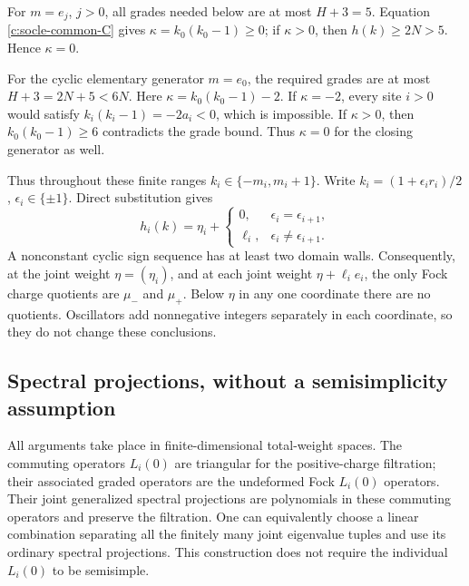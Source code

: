 \documentclass[11pt,a4paper]{article}
\numberwithin{equation}{section}
\theoremstyle{definition}\newtheorem{definition}[theorem]{Definition}
\theoremstyle{remark}\newtheorem{remark}[theorem]{Remark}
\begin{document}
For $m=e_j$, $j>0$, all grades needed below are at most $H+3=5$.
Equation \eqref{c:socle-common-C} gives $\kappa=k_0(k_0-1)\geq0$;
if $\kappa>0$, then $h(k)\geq2N>5$.  Hence $\kappa=0$.

For the cyclic elementary generator $m=e_0$, the required grades are
at most $H+3=2N+5<6N$.  Here $\kappa=k_0(k_0-1)-2$.
If $\kappa=-2$, every site $i>0$ would satisfy
$k_i(k_i-1)=-2a_i<0$, which is impossible.  If $\kappa>0$, then
$k_0(k_0-1)\geq6$ contradicts the grade bound.  Thus $\kappa=0$ for the closing generator as well.

Thus throughout these finite ranges $k_i\in\{-m_i,m_i+1\}$.
Write $k_i=(1+\epsilon_i r_i)/2$, $\epsilon_i\in\{\pm1\}$.
Direct substitution gives
\begin{equation}\label{c:socle-domain-wall}
 h_i(k)=\eta_i+
 \begin{cases}0,&\epsilon_i=\epsilon_{i+1},\\
 \ell_i,&\epsilon_i\ne\epsilon_{i+1}.
 \end{cases}
\end{equation}
A nonconstant cyclic sign sequence has at least two domain walls.
Consequently, at the joint weight $\eta=(\eta_i)$, and at each joint weight
$\eta+\ell_i e_i$, the only Fock charge quotients are $\mu_-$ and
$\mu_+$.  Below $\eta$ in any one coordinate there are no quotients.
Oscillators add nonnegative integers separately in each coordinate, so
they do not change these conclusions.

\subsection*{Spectral projections, without a semisimplicity assumption}
All arguments take place in finite-dimensional total-weight spaces.
The commuting operators $L_i(0)$ are triangular for the positive-charge
filtration; their associated graded operators are the undeformed Fock
$L_i(0)$ operators.  Their joint generalized spectral projections are
polynomials in these commuting operators and preserve the filtration.
One can equivalently choose a linear combination separating all the
finitely many joint eigenvalue tuples and use its ordinary spectral
projections.  This construction does not require the individual $L_i(0)$ to be
semisimple.
\end{document}
